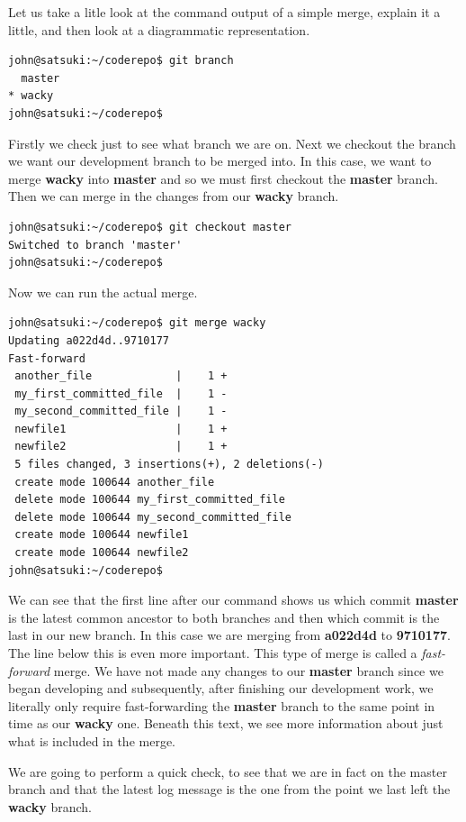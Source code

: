 Let us take a litle look at the command output of a simple merge, explain it a little, and then look at a diagrammatic representation.

\begin{Verbatim}
john@satsuki:~/coderepo$ git branch
  master
* wacky
john@satsuki:~/coderepo$
\end{Verbatim}

Firstly we check just to see what branch we are on.
Next we checkout the branch we want our development branch to be merged into.
In this case, we want to merge \textbf{wacky} into \textbf{master} and so we must first checkout the \textbf{master} branch.
Then we can merge in the changes from our \textbf{wacky} branch.

\begin{Verbatim}
john@satsuki:~/coderepo$ git checkout master
Switched to branch 'master'
john@satsuki:~/coderepo$
\end{Verbatim}

Now we can run the actual merge.

\begin{Verbatim}
john@satsuki:~/coderepo$ git merge wacky
Updating a022d4d..9710177
Fast-forward
 another_file             |    1 +
 my_first_committed_file  |    1 -
 my_second_committed_file |    1 -
 newfile1                 |    1 +
 newfile2                 |    1 +
 5 files changed, 3 insertions(+), 2 deletions(-)
 create mode 100644 another_file
 delete mode 100644 my_first_committed_file
 delete mode 100644 my_second_committed_file
 create mode 100644 newfile1
 create mode 100644 newfile2
john@satsuki:~/coderepo$
\end{Verbatim}

We can see that the first line after our  command shows us which commit \textbf{master} is the latest common ancestor to both branches and then which commit is the last in our new branch.
In this case we are merging from \textbf{a022d4d} to \textbf{9710177}.
The line below this is even more important.
This type of merge is called a \emph{fast-forward} merge.
We have not made any changes to our \textbf{master} branch since we began developing and subsequently, after finishing our development work, we literally only require fast-forwarding the \textbf{master} branch to the same point in time as our \textbf{wacky} one.
Beneath this text, we see more information about just what is included in the merge.

We are going to perform a quick check, to see that we are in fact on the master branch and that the latest log message is the one from the point we last left the \textbf{wacky} branch.


